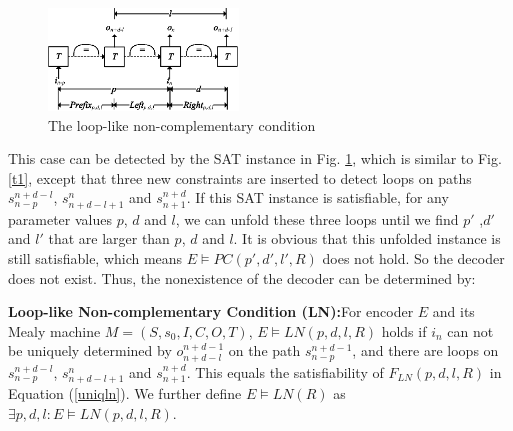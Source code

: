 \documentclass[journal]{IEEEtran}
\begin{document}

\begin{figure}[t]
\begin{center}
\includegraphics[width=0.45\textwidth]{doubleloop}
\end{center}
\caption{The loop-like non-complementary condition}
  \label{fig_double_loop}
\end{figure}

This case can be detected by the SAT instance in Fig. \ref{fig_double_loop},
which is similar to Fig. \ref{t1},
except that three new constraints are inserted to detect loops on paths $s_{n-p}^{n+d-l}$, $s_{n+d-l+1}^n$ and $s_{n+1}^{n+d}$.
If this SAT instance is satisfiable,
for any parameter values $p$, $d$ and $l$,
we can unfold these three loops until we find $p'$ ,$d'$ and $l'$ that are larger than $p$, $d$ and $l$.
It is obvious that this unfolded instance is still satisfiable,
which means $E\vDash PC(p',d',l',R)$ does not hold.
So the decoder does not exist.
%
Thus,
the nonexistence of the decoder can be determined by:

\begin{definition11}\label{def_lnc}%
\textbf{Loop-like Non-complementary Condition (LN):}For encoder $E$ and its Mealy machine $M=(S,s_0,I,C,O,T)$,
$E\vDash LN(p,d,l,R)$ holds if
$i_n$ can not be uniquely determined by $o_{n+d-l}^{n+d-1}$ on the path $s_{n-p}^{n+d-1}$,
and there are loops on $s_{n-p}^{n+d-l}$, $s_{n+d-l+1}^n$ and $s_{n+1}^{n+d}$.
This equals the satisfiability of $F_{LN}(p,d,l,R)$ in Equation (\ref{uniqln}).
We further define $E\vDash LN(R)$ as $\exists p,d,l:E\vDash LN(p,d,l,R)$.
\end{definition11}
\end{document}
